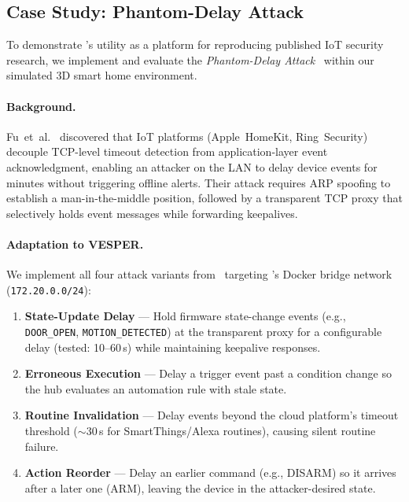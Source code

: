 \subsection{Case Study: Phantom-Delay Attack}\label{sec:eval-phantom-delay}

To demonstrate \sys{}'s utility as a platform for reproducing
published IoT security research, we implement and evaluate the
\emph{Phantom-Delay Attack}~\cite{phantom-delay} within our
simulated 3D smart home environment.

\paragraph{Background.}
Fu~et~al.~\cite{phantom-delay} discovered that IoT platforms
(Apple~HomeKit, Ring~Security) decouple TCP-level timeout detection
from application-layer event acknowledgment, enabling an
attacker on the LAN to delay device events for minutes without
triggering offline alerts.  Their attack requires ARP spoofing to
establish a man-in-the-middle position, followed by a transparent
TCP proxy that selectively holds event messages while forwarding
keepalives.

\paragraph{Adaptation to VESPER.}
We implement all four attack variants from~\cite{phantom-delay}
targeting \sys{}'s Docker bridge network (\texttt{172.20.0.0/24}):
\begin{enumerate}[leftmargin=*]
  \item \textbf{State-Update Delay} --- Hold firmware state-change
    events (e.g., \texttt{DOOR\_OPEN}, \texttt{MOTION\_DETECTED})
    at the transparent proxy for a configurable delay (tested:
    10--60\,s) while maintaining keepalive responses.
  \item \textbf{Erroneous Execution} --- Delay a trigger event past
    a condition change so the hub evaluates an automation rule
    with stale state.
  \item \textbf{Routine Invalidation} --- Delay events beyond the
    cloud platform's timeout threshold ($\sim$30\,s for
    SmartThings/Alexa routines), causing silent routine failure.
  \item \textbf{Action Reorder} --- Delay an earlier command
    (e.g., DISARM) so it arrives after a later one (ARM),
    leaving the device in the attacker-desired state.
\end{enumerate}

